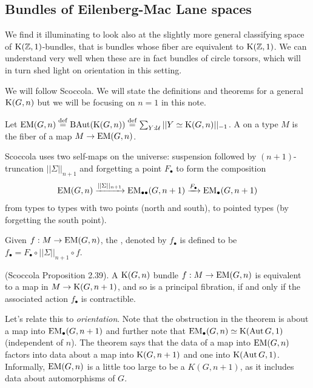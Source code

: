 \subsection{Bundles of Eilenberg-Mac Lane spaces}

We find it illuminating to look also at the slightly more general classifying space of \( \mathrm{K}(\mathbb{Z},1) \)-bundles, that is bundles whose fiber are equivalent to \( \mathrm{K}(\mathbb{Z},1) \). We can understand very well when these are in fact bundles of circle torsors, which will in turn shed light on orientation in this setting. 

We will follow Scoccola\cite{sco}. We will state the definitions and theorems for a general \( \mathrm{K}(G,n) \) but we will be focusing on \( n=1 \) in this note.

\begin{mydef}
Let \( \mathrm{EM}(G,n)\stackrel{\mathrm{def}}{=} \operatorname{BAut}(\mathrm{K}(G,n))\stackrel{\mathrm{def}}{=} \sum_{Y:\mathcal{U}}||Y\simeq \mathrm{K}(G,n)||_{-1}\). A  on a type \( M \) is the fiber of a map \( M\to\mathrm{EM}(G,n) \).
\end{mydef}

Scoccola uses two self-maps on the universe: suspension followed by \( (n+1) \)-truncation \( ||\Sigma||_{n+1} \) and forgetting a point \( F_\bullet \) to form the composition 
\[ 
\mathrm{EM}(G,n)\xrightarrow[]{||\Sigma||_{n+1}} \mathrm{EM}_{\bullet\bullet}(G,n+1)\xrightarrow[]{F_\bullet}\mathrm{EM_{\bullet}}(G,n+1)
\]
from types to types with two points (north and south), to pointed types (by forgetting the south point).

\begin{mydef}
Given \( f:M\to\mathrm{EM}(G,n) \), the , denoted by \( f_\bullet \) is defined to be \( f_\bullet=F_\bullet\circ||\Sigma||_{n+1}\circ f \).
\end{mydef}

\begin{mythm}
(Scoccola\cite{sco} Proposition 2.39). A \( \mathrm{K}(G,n) \) bundle \( f:M\to\mathrm{EM}(G,n) \) is equivalent to a map in \( M\to\mathrm{K}(G,n+1) \), and so is a principal fibration, if and only if the associated action \( f_\bullet \) is contractible.
\end{mythm}

Let's relate this to \emph{orientation}. Note that the obstruction in the theorem is about a map into \( \mathrm{EM_{\bullet}}(G,n+1) \) and further note that \( \mathrm{EM_{\bullet}}(G,n)\simeq \mathrm{K}(\operatorname{Aut} G,1) \) (independent of \( n \)). The theorem says that the data of a map into \( \mathrm{EM}(G,n) \) factors into data about a map into \( \mathrm{K}(G,n+1) \) and one into \( \mathrm{K}(\operatorname{Aut} G,1) \). Informally, \( \mathrm{EM}(G,n) \) is a little too large to be a \( K(G,n+1) \), as it includes data about automorphisms of \( G \).

